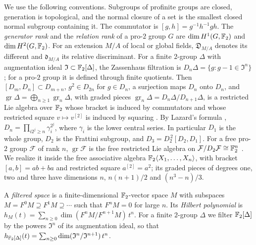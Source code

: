 We use the following conventions. Subgroups of profinite groups are closed,
generation is topological, and the normal closure of a set is the smallest
closed normal subgroup containing it. The commutator is
$[g,h]=g^{-1}h^{-1}gh$. The \emph{generator rank} and the \emph{relation
rank} of a pro-$2$ group $G$ are $\dim H^1(G,\mathbb F_2)$ and $\dim H^2(G,\mathbb F_2)$.
For an extension $M/A$ of local or global fields, $\mathfrak D_{M/A}$ denotes
its different and $\mathfrak d_{M/A}$ its relative discriminant. For a finite
$2$-group $\Delta$ with augmentation
ideal $\mathfrak I\subset\mathbb F_2[\Delta]$, the Zassenhaus filtration is
$D_n\Delta=\{g:g-1\in\mathfrak I^n\}$; for a pro-$2$ group it is defined
through finite quotients. Then $[D_m,D_n]\subset D_{m+n}$, $g^2\in D_{2n}$
for $g\in D_n$, a surjection maps $D_n$ onto $D_n$, and
$\operatorname{gr}\Delta=\bigoplus_{n\ge1}\operatorname{gr}_n\Delta$, with
graded pieces $\operatorname{gr}_n\Delta=D_n\Delta/D_{n+1}\Delta$, is a
restricted Lie algebra over $\mathbb F_2$ whose bracket is induced by commutators
and whose restricted square $v\mapsto v^{[2]}$ is induced by squaring
\cite{Jennings,Quillen,Ershov2012}. By Lazard's formula
\cite[Proposition~3.2]{Ershov2012}, $D_n=\prod_{i2^j\ge n}\gamma_i^{2^j}$,
where $\gamma_i$ is the lower central series. In particular $D_1$ is the
whole group, $D_2$ is the Frattini subgroup, and $D_3=D_2^{\,2}[D_2,D_1]$. For
a free pro-$2$ group $\mathcal F$ of rank $n$, $\operatorname{gr}\mathcal F$
is the free restricted Lie algebra on $\mathcal F/D_2\mathcal F\cong\mathbb F_2^n$
\cite{Quillen,Ershov2012}. We realize it inside the free associative
algebra $\mathbb F_2\langle X_1,\dots,X_n\rangle$, with bracket $[a,b]=ab+ba$ and
restricted square $a^{[2]}=a^2$; its graded pieces of degrees one, two and
three have dimensions $n$, $n(n+1)/2$ and $(n^3-n)/3$.

\begin{definition}\label{tw:hilbert-def}
A \emph{filtered space} is a finite-dimensional $\mathbb F_2$-vector space $M$
with subspaces $M=F^0M\supseteq F^1M\supseteq\cdots$ such that $F^nM=0$ for
large $n$. Its \emph{Hilbert polynomial} is
$h_M(t)=\sum_{n\ge0}\dim(F^nM/F^{n+1}M)\,t^n$. For a finite $2$-group
$\Delta$ we filter $\mathbb F_2[\Delta]$ by the powers $\mathfrak I^n$ of its
augmentation ideal, so that
$h_{\mathbb F_2[\Delta]}(t)=\sum_{n\ge0}\dim(\mathfrak I^n/\mathfrak I^{n+1})\,t^n$.
\end{definition}

